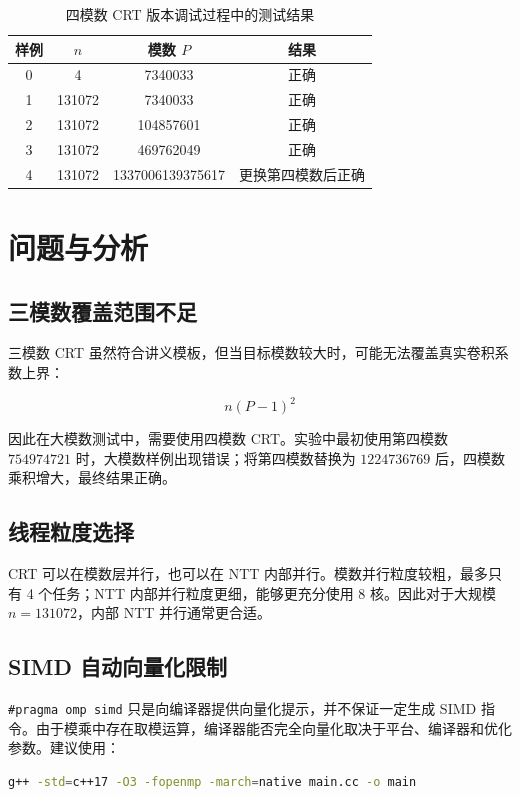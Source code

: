 \documentclass[UTF8,a4paper,12pt]{ctexart}
\begin{document}
\begin{table}[h]
\centering
\caption{四模数 CRT 版本调试过程中的测试结果}
\begin{tabular}{cccc}
\toprule
样例 & $n$ & 模数 $P$ & 结果 \\
\midrule
0 & 4 & 7340033 & 正确 \\
1 & 131072 & 7340033 & 正确 \\
2 & 131072 & 104857601 & 正确 \\
3 & 131072 & 469762049 & 正确 \\
4 & 131072 & 1337006139375617 & 更换第四模数后正确 \\
\bottomrule
\end{tabular}
\end{table}

\section{问题与分析}

\subsection{三模数覆盖范围不足}

三模数 CRT 虽然符合讲义模板，但当目标模数较大时，可能无法覆盖真实卷积系数上界：

\[
n(P-1)^2
\]

因此在大模数测试中，需要使用四模数 CRT。实验中最初使用第四模数 $754974721$ 时，大模数样例出现错误；将第四模数替换为 $1224736769$ 后，四模数乘积增大，最终结果正确。

\subsection{线程粒度选择}

CRT 可以在模数层并行，也可以在 NTT 内部并行。模数并行粒度较粗，最多只有 4 个任务；NTT 内部并行粒度更细，能够更充分使用 8 核。因此对于大规模 $n=131072$，内部 NTT 并行通常更合适。

\subsection{SIMD 自动向量化限制}

\texttt{\#pragma omp simd} 只是向编译器提供向量化提示，并不保证一定生成 SIMD 指令。由于模乘中存在取模运算，编译器能否完全向量化取决于平台、编译器和优化参数。建议使用：

\begin{lstlisting}[language=bash]
g++ -std=c++17 -O3 -fopenmp -march=native main.cc -o main
\end{lstlisting}
\end{document}
